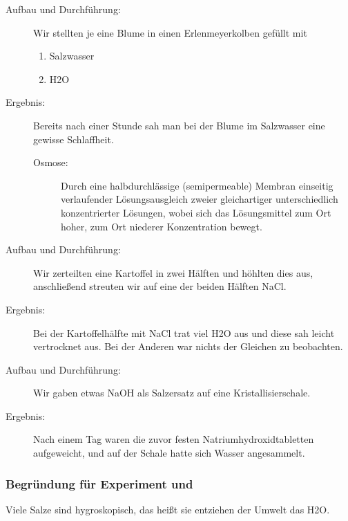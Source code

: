\begin{description}
   \item[Aufbau und Durchführung:] Wir stellten je eine Blume in einen Erlenmeyerkolben gefüllt mit\begin{enumerate}\item Salzwasser\item \ac{H2O}\end{enumerate}
   \item[Ergebnis:] Bereits nach einer Stunde sah man bei der Blume im Salzwasser eine gewisse Schlaffheit.
   \begin{description}
      \item[Osmose:] Durch eine halbdurchlässige (semipermeable) Membran einseitig verlaufender Lösungsausgleich zweier gleichartiger unterschiedlich konzentrierter Lösungen, wobei sich das Lösungsmittel zum Ort hoher, zum Ort niederer Konzentration bewegt.
   \end{description}
\end{description}

\begin{description}
   \item[Aufbau und Durchführung:] Wir zerteilten eine Kartoffel in zwei Hälften und höhlten dies aus, anschließend streuten wir auf eine der beiden Hälften \ac{NaCl}.
   \item[Ergebnis:] Bei der Kartoffelhälfte mit \ac{NaCl} trat viel \ac{H2O} aus und diese sah leicht vertrocknet aus. Bei der Anderen war nichts der Gleichen zu beobachten.
\end{description}

\begin{description}
   \item[Aufbau und Durchführung:]  Wir gaben etwas \ac{NaOH} als Salzersatz auf eine Kristallisierschale.
   \item[Ergebnis:] Nach einem Tag waren die zuvor festen Natriumhydroxidtabletten aufgeweicht, und auf der Schale hatte sich Wasser angesammelt.
\end{description}

\setcounter{cVersuchSubtra}{\value{cVersuch}}\addtocounter{cVersuchSubtra}{-1}
\subsubsection{Begründung für Experiment  und }
Viele Salze sind hygroskopisch, das heißt sie entziehen der Umwelt das \ac{H2O}.

